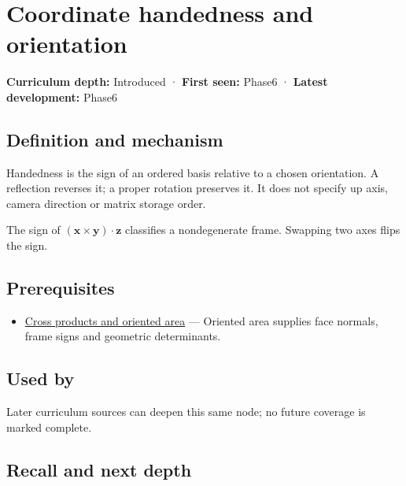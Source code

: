 \hypertarget{appendix-87d7626c8d37}{}\label{referencestart:appendix-87d7626c8d37}
\section{Coordinate handedness and orientation}\label{appendix-87d7626c8d37-coordinate-handedness-and-orientation}

\textbf{Curriculum depth:} Introduced · \textbf{First seen:} Phase6 · \textbf{Latest development:} Phase6

\begin{allmightroledefinition}

\subsection{Definition and mechanism}\label{appendix-87d7626c8d37-definition-and-mechanism}

Handedness is the sign of an ordered basis relative to a chosen orientation. A reflection reverses it; a proper rotation preserves it. It does not specify up axis, camera direction or matrix storage order.

\end{allmightroledefinition}

The sign of \((\mathbf x\times\mathbf y)\cdot\mathbf z\) classifies a nondegenerate frame. Swapping two axes flips the sign.

\subsection{Prerequisites}\label{appendix-87d7626c8d37-prerequisites}

\begin{itemize}
\tightlist
\item
  \hyperref[appendix-2391db8052b1]{Cross products and oriented area} --- Oriented area supplies face normals, frame signs and geometric determinants.
\end{itemize}

\subsection{Used by}\label{appendix-87d7626c8d37-used-by}

Later curriculum sources can deepen this same node; no future coverage is marked complete.

\subsection{Recall and next depth}\label{appendix-87d7626c8d37-recall-and-next-depth}

